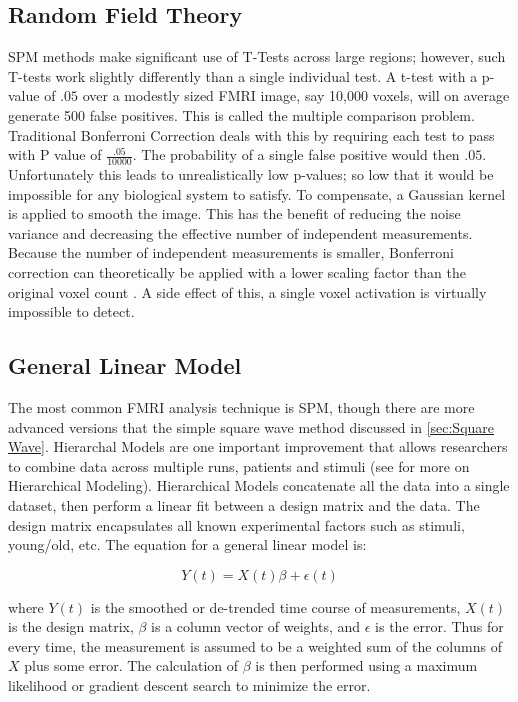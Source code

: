 \subsection{Random Field Theory}
SPM methods make significant use of T-Tests across large regions;
however, such T-tests work slightly differently than a single
individual test. A t-test with a p-value of $.05$ over a modestly sized FMRI image,
say 10,000 voxels, will on average generate 500 false
positives. This is called the multiple comparison problem. Traditional
Bonferroni Correction
deals with this by requiring each test to pass with P
value of $\frac{.05}{10000}$. The probability of 
a single false positive would then $.05$. Unfortunately this leads to unrealistically
low p-values; so low that it would be impossible for any biological system to satisfy. To
compensate, a Gaussian kernel is applied to smooth the image. This has
the benefit of reducing the noise variance and 
decreasing the effective number of independent measurements. Because
the number of independent measurements is smaller, Bonferroni correction
can theoretically be applied with a lower scaling factor than
the original voxel count \cite{Worsley2004}. A side effect of this,
a single voxel activation is virtually impossible to detect.

\subsection{General Linear Model}
\label{sec:Current Techniques General Linear Model}
The most common FMRI analysis technique is SPM, though there
are more advanced versions that the simple square wave
method discussed in \autoref{sec:Square Wave}. Hierarchal
Models are one important improvement that allows researchers
to combine data across multiple runs, patients and stimuli
(see \cite{Hofmann1997} for more on Hierarchical Modeling). 
Hierarchical Models
concatenate all the data into a single dataset, then perform
a linear fit between a design matrix and the data. The design matrix
encapsulates all known experimental factors such as stimuli,
young/old, etc.  The equation for a general linear model is:

\begin{equation}
Y(t) = X(t)\beta + \epsilon(t)
\end{equation}

where $Y(t)$ is the smoothed or de-trended time course of measurements,
$X(t)$ is the design matrix, $\beta$ is a column vector of weights,
and $\epsilon$ is the error. Thus for every time, the measurement is
assumed to be a weighted sum of the columns of $X$ plus some error. The calculation
of $\beta$ is then performed using a maximum likelihood or gradient descent search 
to minimize the error. 

